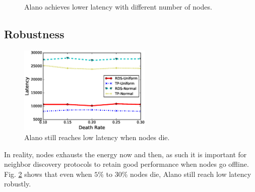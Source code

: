 \begin{figure}[!h]
\centering
{}
\hspace{0.01in}
\caption{Alano achieves lower latency with different number of nodes.}
\label{fig_node}
\end{figure}

\subsection{Robustness}


\begin{figure}[!h]
\centering
\includegraphics[width=2.5in]{Figure/robust}
\caption{Alano still reaches low latency when nodes die.}
\label{fig_robust}
\end{figure}

In reality, nodes exhausts the energy now and then, as such it is important for neighbor discovery protocols to retain good performance when nodes go offline. Fig. \ref{fig_robust} shows that even when $5\%$ to $30\%$ nodes die, Alano still reach low latency robustly.

